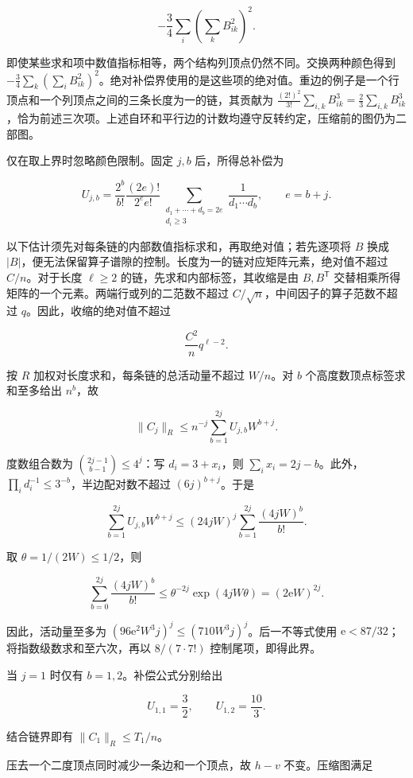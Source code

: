 \documentclass[11pt,a4paper]{article}
\begin{document}
\[-\frac34\sum_i\left(\sum_k B_{ik}^2\right)^2.\]

即使某些求和项中数值指标相等，两个结构列顶点仍然不同。交换两种颜色得到 \(-\tfrac34\sum_k(\sum_i B_{ik}^2)^2\)。绝对补偿界使用的是这些项的绝对值。重边的例子是一个行顶点和一个列顶点之间的三条长度为一的链，其贡献为 \(\tfrac{(2!)^2}{3!}\sum_{i,k}B_{ik}^3=\tfrac23\sum_{i,k}B_{ik}^3\)，恰为前述三次项。上述自环和平行边的计数均遵守反转约定，压缩前的图仍为二部图。

仅在取上界时忽略颜色限制。固定 \(j,b\) 后，所得总补偿为

\[U_{j,b}=
\frac{2^b}{b!}\frac{(2e)!}{2^e e!}
\sum_{\substack{d_1+\cdots+d_b=2e\\d_i\ge3}}
\frac1{d_1\cdots d_b},
\qquad e=b+j.\]

以下估计须先对每条链的内部数值指标求和，再取绝对值；若先逐项将 \(B\) 换成 \(|B|\)，便无法保留算子谱隙的控制。长度为一的链对应矩阵元素，绝对值不超过 \(C/n\)。对于长度 \(\ell\ge2\) 的链，先求和内部标签，其收缩是由 \(B,B^{\mathsf T}\) 交替相乘所得矩阵的一个元素。两端行或列的二范数不超过 \(C/\sqrt n\)，中间因子的算子范数不超过 \(q\)。因此，收缩的绝对值不超过

\[\frac{C^2}{n}q^{\ell-2}.\]

按 \(R\) 加权对长度求和，每条链的总活动量不超过 \(W/n\)。对 \(b\) 个高度数顶点标签求和至多给出 \(n^b\)，故

\[\|C_j\|_R\le n^{-j}
\sum_{b=1}^{2j}U_{j,b}W^{b+j}.\]

度数组合数为 \(\binom{2j-1}{b-1}\le4^j\)：写 \(d_i=3+x_i\)，则 \(\sum_i x_i=2j-b\)。此外，\(\prod_i d_i^{-1}\le3^{-b}\)，半边配对数不超过 \((6j)^{b+j}\)。于是

\[\sum_{b=1}^{2j}U_{j,b}W^{b+j}
\le(24jW)^j
\sum_{b=1}^{2j}\frac{(4jW)^b}{b!}.\]

取 \(\theta=1/(2W)\le1/2\)，则

\[\sum_{b=0}^{2j}\frac{(4jW)^b}{b!}
\le\theta^{-2j}\exp(4jW\theta)
=(2\mathrm e W)^{2j}.\]

因此，活动量至多为 \((96\mathrm e^2W^3j)^j\le(710W^3j)^j\)。后一不等式使用 \(\mathrm e<87/32\)；将指数级数求和至六次，再以 \(8/(7\cdot7!)\) 控制尾项，即得此界。

当 \(j=1\) 时仅有 \(b=1,2\)。补偿公式分别给出

\[U_{1,1}=\frac32,\qquad U_{1,2}=\frac{10}{3}.\]

结合链界即有 \(\|C_1\|_R\le T_1/n\)。

压去一个二度顶点同时减少一条边和一个顶点，故 \(h-v\) 不变。压缩图满足
\end{document}

